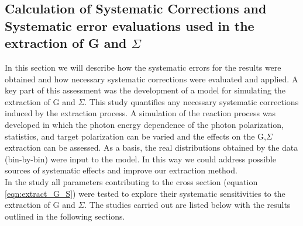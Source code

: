 \subsection{Calculation of Systematic Corrections and Systematic error evaluations used in  the extraction of G and \texorpdfstring{$\Sigma$}{Sigma}}
\label{ch:sys_corr}
In this section we will describe how the systematic errors for the results were obtained and how necessary systematic corrections were evaluated and applied. A key part of this assessment was the development of a model for simulating the extraction of G and $\Sigma$. This study  quantifies any necessary systematic corrections induced by the extraction process. A simulation of the reaction process was developed in which the photon energy dependence of the photon polarization, statistics, and target polarization can be varied and the effects on the G,$\Sigma$ extraction can be assessed. As a basis, the real distributions obtained by the data (bin-by-bin) were input to the model. In this way we could address possible sources of systematic effects and improve our extraction method. \\ 
In the study all parameters contributing to the cross section (equation \ref{eqn:extract_G_S}) were tested to explore their systematic sensitivities to the extraction of G and $\Sigma$. The studies carried out are listed below with the results outlined in the following sections.

